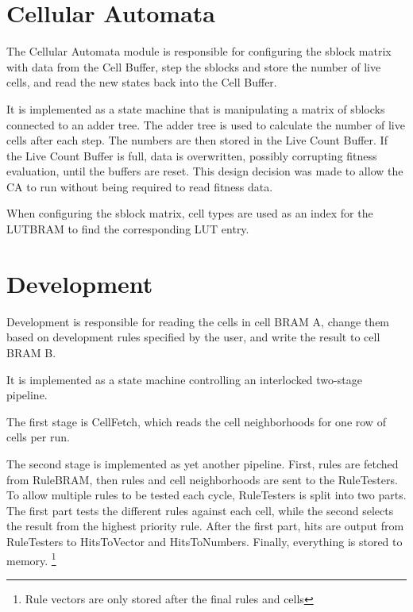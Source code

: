 

\section{Cellular Automata}

The Cellular Automata module is responsible for configuring the sblock matrix with data from the Cell Buffer, step the sblocks and store the number of live cells, and read the new states back into the Cell Buffer.

It is implemented as a state machine that is manipulating a matrix of sblocks connected to an adder tree.
The adder tree is used to calculate the number of live cells after each step.
The numbers are then stored in the Live Count Buffer.
If the Live Count Buffer is full, data is overwritten, possibly corrupting fitness evaluation, until the buffers are reset.
This design decision was made to allow the CA to run without being required to read fitness data.

When configuring the sblock matrix, cell types are used as an index for the LUTBRAM to find the corresponding LUT entry.

\section{Development}

Development is responsible for reading the cells in cell BRAM A, change them based on development rules specified by the user, and write the result to cell BRAM B.

It is implemented as a state machine controlling an interlocked two-stage pipeline.

The first stage is CellFetch, which reads the cell neighborhoods for one row of cells per run.

The second stage is implemented as yet another pipeline.
First, rules are fetched from RuleBRAM, then rules and cell neighborhoods are sent to the RuleTesters.
To allow multiple rules to be tested each cycle, RuleTesters is split into two parts.
The first part tests the different rules against each cell, while the second selects the result from the highest priority rule.
After the first part, hits are output from RuleTesters to HitsToVector and HitsToNumbers.
Finally, everything is stored to memory.
\footnote{Rule vectors are only stored after the final rules and cells}

